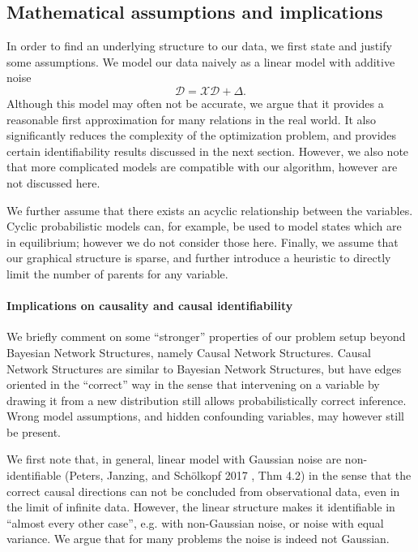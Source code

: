 \documentclass[11pt]{article}
\makeatletter
\newcommand{\cslcitation}[2]
 {\protect\hyper@linkstart{cite}{citeproc_bib_item_#1}#2\hyper@linkend}
\makeatother
\begin{document}
\subsection{Mathematical assumptions and implications  \label{sec:model-assumptions}}
\label{sec:org81c0c42}
In order to find an underlying structure to our data, we first state and justify some assumptions.
We model our data naively as a linear model with additive noise
\[
\mathcal{D} = \mathcal{X}\mathcal{D} + \Delta.
\]
Although this model may often not be accurate, we argue that it provides a reasonable first approximation for many relations in the real world.
It also significantly reduces the complexity of the optimization problem, and provides certain identifiability results discussed in the next section.
However, we also note that more complicated models are compatible with our algorithm, however are not discussed here.

We further assume that there exists an acyclic relationship between the variables.
Cyclic probabilistic models can, for example, be used to model states which are in equilibrium; however we do not consider those here.
Finally, we assume that our graphical structure is sparse, and further introduce a heuristic to directly limit the number of parents for any variable.

\paragraph{Implications on causality and causal identifiability}
\label{sec:org2a80339}
We briefly comment on some ``stronger'' properties of our problem setup beyond Bayesian Network Structures, namely Causal Network Structures.
Causal Network Structures are similar to Bayesian Network Structures, but have edges oriented in the ``correct'' way in the sense that intervening on a variable by drawing it from a new distribution still allows probabilistically correct inference.
Wrong model assumptions, and hidden confounding variables, may however still be present.

We first note that, in general, linear model with Gaussian noise are non-identifiable (\cslcitation{11}{Peters, Janzing, and Schölkopf 2017} , Thm 4.2) in the sense that the correct causal directions can not be concluded from observational data, even in the limit of infinite data.
However, the linear structure makes it identifiable in ``almost every other case'', e.g. with non-Gaussian noise, or noise with equal variance.
We argue that for many problems the noise is indeed not Gaussian.
\end{document}
